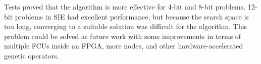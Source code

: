 \documentclass{sig-alternate}
\begin{document}
Tests proved that the algorithm is more effective for 4-bit and 8-bit problems. 12-bit problems in SIE had excellent performance, but because the search space is too long, converging to a suitable solution was difficult for the algorithm. This problem could be solved as future work with some improvements in terms of multiple FCUs inside an FPGA, more nodes, and other hardware-accelerated genetic operators.





\end{document}
